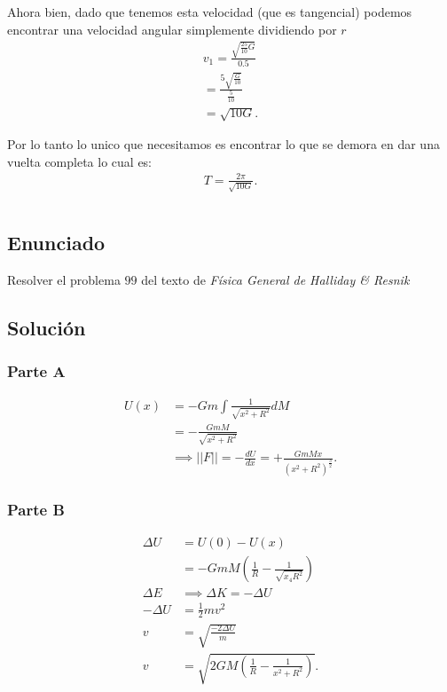 \documentclass{report}
\begin{document}
Ahora bien, dado que tenemos esta velocidad (que es tangencial) podemos encontrar una velocidad angular simplemente dividiendo por $r$
\begin{align*}
  v_1 = \frac{\sqrt{\frac{25}{10}G} }{0.5}\\
  = \frac{5 \sqrt{\frac{G}{10}} }{\frac{5}{10}}\\
  = \sqrt{10G}
.\end{align*}

Por lo tanto lo unico que necesitamos es encontrar lo que se demora en dar una vuelta completa lo cual es:
\begin{align*}
  T = \frac{2\pi}{\sqrt{10G}}
.\end{align*}

\chapter{}
\section{Enunciado}

Resolver el problema $99$ del texto de \textit{Física General de Halliday \& Resnik}

\section{Solución}

\subsection{Parte A}

\begin{align*}
  U\left( x \right) &= -Gm \int \frac{1}{\sqrt{x^2+R^2} }dM\\
  &= - \frac{GmM}{\sqrt{x^2 + R^2} } \\
  &\implies ||F||= -\frac{dU}{dx}=+\frac{GmMx}{\left( x^2+R^2 \right)^{\frac{3}{2}}}
.\end{align*}

\subsection{Parte B}

\begin{align*}
  \Delta U &= U\left( 0 \right) - U\left( x \right)  \\
  &= -GmM \left( \frac{1}{R}-\frac{1}{\sqrt{x_4R^2} } \right)  \\
  \Delta E &\implies \Delta K = - \Delta U \\
  -\Delta U &= \frac{1}{2}mv^2 \\
  v &= \sqrt{\frac{-2\Delta U}{m}}  \\
  v &= \sqrt{2GM\left( \frac{1}{R} - \frac{1}{x^2+R^2} \right) }
.\end{align*}
 
\end{document}
